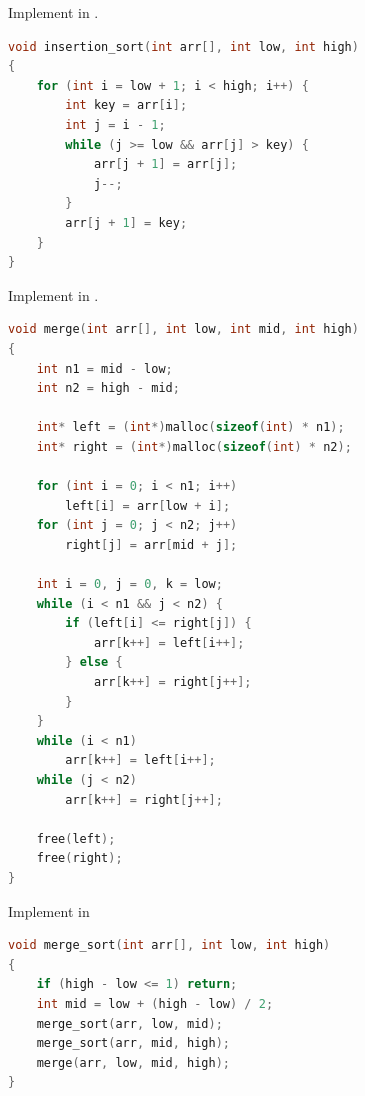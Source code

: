 
\begin{question}{
Implement  in .
}
\begin{lstlisting}[language=C, style=C]
void insertion_sort(int arr[], int low, int high)
{
    for (int i = low + 1; i < high; i++) {
        int key = arr[i];
        int j = i - 1;
        while (j >= low && arr[j] > key) {
            arr[j + 1] = arr[j];
            j--;
        }
        arr[j + 1] = key;
    }
}
\end{lstlisting}
\end{question}


\begin{question_with_subs}{}
\begin{subq}{Implement  in .}
\begin{lstlisting}[language=C, style=C]
void merge(int arr[], int low, int mid, int high)
{
    int n1 = mid - low;
    int n2 = high - mid;

    int* left = (int*)malloc(sizeof(int) * n1);
    int* right = (int*)malloc(sizeof(int) * n2);

    for (int i = 0; i < n1; i++)
        left[i] = arr[low + i];
    for (int j = 0; j < n2; j++)
        right[j] = arr[mid + j];

    int i = 0, j = 0, k = low;
    while (i < n1 && j < n2) {
        if (left[i] <= right[j]) {
            arr[k++] = left[i++];
        } else {
            arr[k++] = right[j++];
        }
    }
    while (i < n1)
        arr[k++] = left[i++];
    while (j < n2)
        arr[k++] = right[j++];

    free(left);
    free(right);
}
\end{lstlisting}
\end{subq}

\begin{subq}{Implement  in }
\begin{lstlisting}[language=C, style=C]
void merge_sort(int arr[], int low, int high)
{
    if (high - low <= 1) return;
    int mid = low + (high - low) / 2;
    merge_sort(arr, low, mid);
    merge_sort(arr, mid, high);
    merge(arr, low, mid, high);
}
\end{lstlisting}
\end{subq}
\end{question_with_subs}


